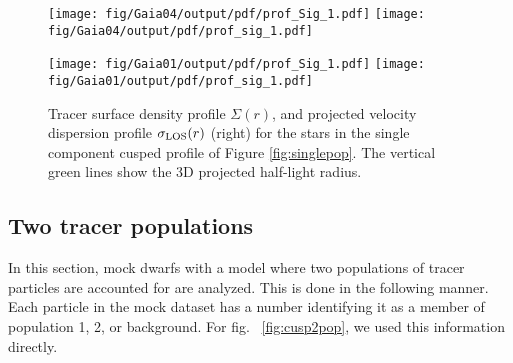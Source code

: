 \begin{figure*}
    \begin{center}
        \texttt{[image: fig/Gaia04/output/pdf/prof\_Sig\_1.pdf]}
        \texttt{[image: fig/Gaia04/output/pdf/prof\_sig\_1.pdf]}

        \texttt{[image: fig/Gaia01/output/pdf/prof\_Sig\_1.pdf]}
        \texttt{[image: fig/Gaia01/output/pdf/prof\_sig\_1.pdf]}
        \caption{\label{fig:Sigsiglos1pop} Tracer
          surface density profile $\Sigma(r)$, and
          projected velocity dispersion profile
          $\sigma_{\text{LOS}}(r)$ (right) for the stars in
          the single component cusped profile of
          Figure \ref{fig:singlepop}. The vertical
          green lines show the 3D projected
          half-light radius.}
    \end{center}
\end{figure*}

\subsection{Two tracer populations}

In this section, mock dwarfs with a model where
two populations of tracer particles are accounted
for are analyzed. This is done in the following
manner. Each particle in the mock dataset has a
number identifying it as a member of population 1,
2, or background. For fig.  ~\ref{fig:cusp2pop},
we used this information directly.

